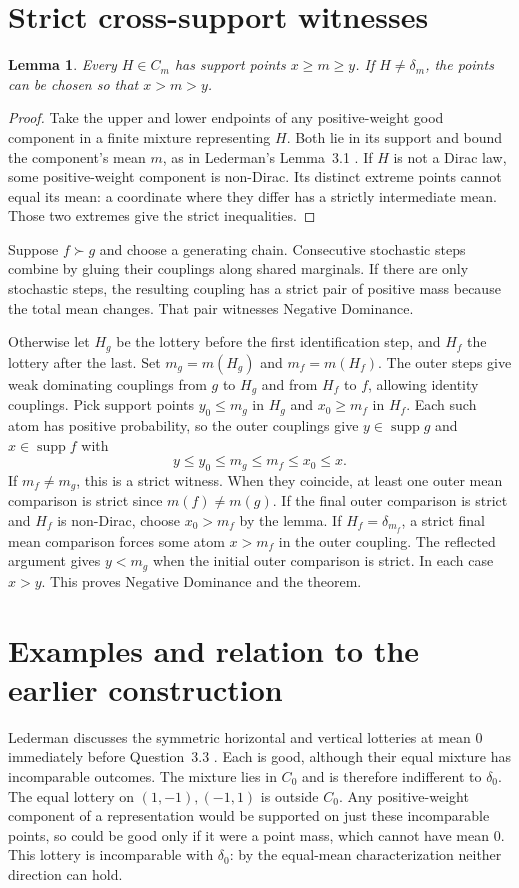 \documentclass[11pt,a4paper]{amsart}
\newtheorem{lemma}[theorem]{Lemma}
\newcommand{\supp}{\operatorname{supp}}
\begin{document}
\section{Strict cross-support witnesses}
\begin{lemma}
Every $H\in C_m$ has support points $x\ge m\ge y$. If $H\ne\delta_m$, the points can be chosen so that $x>m>y$.
\end{lemma}
\begin{proof}
Take the upper and lower endpoints of any positive-weight good component in a finite mixture representing $H$. Both lie in its support and bound the component's mean $m$, as in Lederman's Lemma~3.1 \cite{lederman}. If $H$ is not a Dirac law, some positive-weight component is non-Dirac. Its distinct extreme points cannot equal its mean: a coordinate where they differ has a strictly intermediate mean. Those two extremes give the strict inequalities.
\end{proof}

Suppose $f\succ g$ and choose a generating chain. Consecutive stochastic steps combine by gluing their couplings along shared marginals. If there are only stochastic steps, the resulting coupling has a strict pair of positive mass because the total mean changes. That pair witnesses Negative Dominance.

Otherwise let $H_g$ be the lottery before the first identification step, and $H_f$ the lottery after the last. Set $m_g=m(H_g)$ and $m_f=m(H_f)$. The outer steps give weak dominating couplings from $g$ to $H_g$ and from $H_f$ to $f$, allowing identity couplings. Pick support points $y_0\le m_g$ in $H_g$ and $x_0\ge m_f$ in $H_f$. Each such atom has positive probability, so the outer couplings give $y\in\supp g$ and $x\in\supp f$ with
\[
                 y\le y_0\le m_g\le m_f\le x_0\le x .
\]
If $m_f\ne m_g$, this is a strict witness. When they coincide, at least one outer mean comparison is strict since $m(f)\ne m(g)$. If the final outer comparison is strict and $H_f$ is non-Dirac, choose $x_0>m_f$ by the lemma. If $H_f=\delta_{m_f}$, a strict final mean comparison forces some atom $x>m_f$ in the outer coupling. The reflected argument gives $y<m_g$ when the initial outer comparison is strict. In each case $x>y$. This proves Negative Dominance and the theorem.

\section{Examples and relation to the earlier construction}
Lederman discusses the symmetric horizontal and vertical lotteries at mean $0$ immediately before Question~3.3 \cite[p.~26]{lederman}. Each is good, although their equal mixture has incomparable outcomes. The mixture lies in $C_0$ and is therefore indifferent to $\delta_0$. The equal lottery on $(1,-1),(-1,1)$ is outside $C_0$. Any positive-weight component of a representation would be supported on just these incomparable points, so could be good only if it were a point mass, which cannot have mean $0$. This lottery is incomparable with $\delta_0$: by the equal-mean characterization neither direction can hold.
\end{document}
